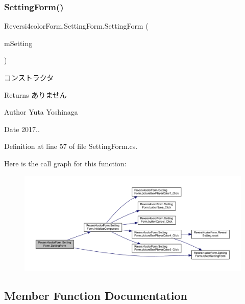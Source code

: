 \subsubsection{\texorpdfstring{Setting\+Form()}{SettingForm()}}
{\footnotesize\ttfamily Reversi4color\+Form.\+Setting\+Form.\+Setting\+Form (\begin{DoxyParamCaption}\item[{\hyperlink{class_reversi4color_form_1_1_reversi_setting}{Reversi\+Setting}}]{m\+Setting }\end{DoxyParamCaption})}



コンストラクタ 

\begin{DoxyReturn}{Returns}
ありません 
\end{DoxyReturn}
\begin{DoxyAuthor}{Author}
Yuta Yoshinaga 
\end{DoxyAuthor}
\begin{DoxyDate}{Date}
2017.. 
\end{DoxyDate}


Definition at line 57 of file Setting\+Form.\+cs.

Here is the call graph for this function\+:\nopagebreak
\begin{figure}[H]
\begin{center}
\leavevmode
\includegraphics[width=350pt]{class_reversi4color_form_1_1_setting_form_abad707f432da3b5a135419320dbf331d_cgraph}
\end{center}
\end{figure}


\subsection{Member Function Documentation}
\mbox{\label{class_reversi4color_form_1_1_setting_form_a7e7098f2ad774fc34694fd778318a014}} 
